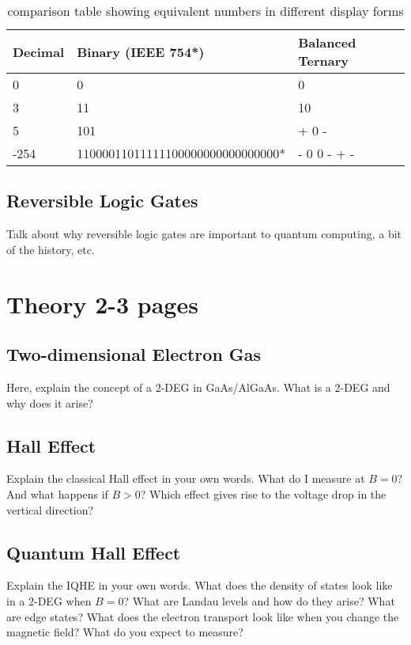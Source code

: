 \documentclass[a4paper]{article}
\begin{document}
\begin{table} %
	\centering
	\begin{tabular}{l|l|l} %
		Decimal & Binary (IEEE 754*) & Balanced Ternary \\\hline %
		0 & 0 & 0 \\
		3 & 11 & 10 \\
		5 & 101 & + 0 - \\
		-254 & 11000011011111100000000000000000* & - 0 0 - + - \\ %
	\end{tabular}
	\caption{\label{tab:widgets}comparison table showing equivalent numbers in different display forms}
\end{table}


\subsection{Reversible Logic Gates} %
Talk about why reversible logic gates are important to quantum computing, a bit of the history, etc.


\section{Theory 2-3 pages}
\label{sec:theory}

\subsection{Two-dimensional Electron Gas}
Here, explain the concept of a 2-DEG in GaAs/AlGaAs. What is a 2-DEG and why does it arise?

\subsection{Hall Effect}
Explain the classical Hall effect in your own words. What do I measure at $B=0$? And what happens if $B>0$? Which effect gives rise to the voltage drop in the vertical direction?

\subsection{Quantum Hall Effect}
Explain the IQHE in your own words. What does the density of states look like in a 2-DEG when $B=0$? What are Landau levels and how do they arise? What are edge states? What does the electron transport look like when you change the magnetic field? What do you expect to measure?
\end{document}
